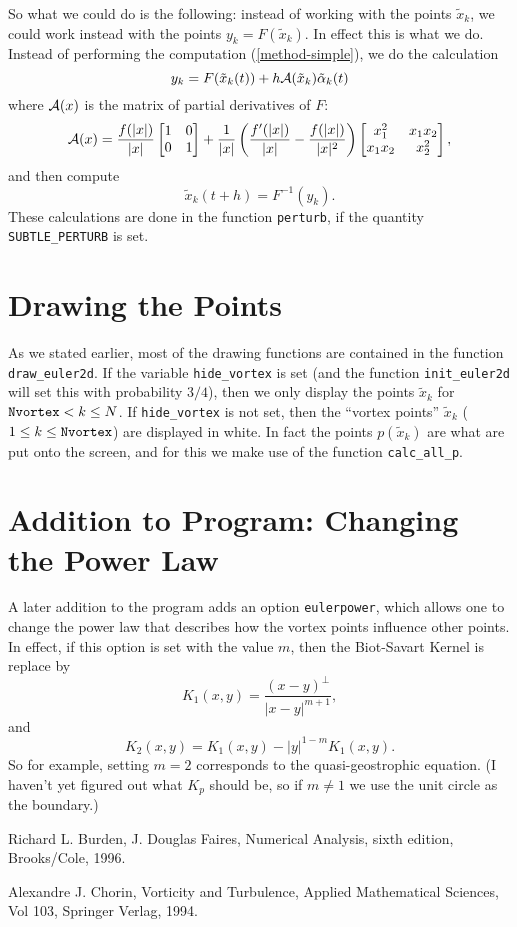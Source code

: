 \documentclass[12pt]{article}
\begin{document}
So what we could do is the following: instead of working with
the points $\tilde x_k$, we could work instead with the points
$y_k = F(\tilde x_k)$.  In effect this is what we do.
Instead of performing the computation (\ref{method-simple}),
we do the calculation
\begin{equation*}
y_k = F(\tilde x_k(t)) + h {\cal A}(\tilde x_k) \tilde\alpha_k(t)
\end{equation*}
where
${\cal A}(x)$ is the matrix of partial derivatives of $F$:
\begin{equation*}
{\cal A}(x) =
\frac{f(|x|)}{|x|}
\left[
\begin{matrix}
1 & 0\\
0 & 1
\end{matrix}
\right]
+ \frac1{|x|}
  \left(\frac{f'(|x|)}{|x|} - \frac{f(|x|)}{|x|^2}\right)
\left[
\begin{matrix}
x_{1}^2   & x_{1} x_{2}\\
x_{1} x_{2} & x_{2}^2
\end{matrix}
\right],
\end{equation*}
and then compute
\begin{equation*}
\tilde x_k(t+h) = F^{-1}(y_k).
\end{equation*}
These calculations are done in the function {\tt perturb}, if
the quantity {\tt SUBTLE\_PERTURB} is set.

\section{Drawing the Points}

As we stated earlier, most of the drawing functions are contained
in the function {\tt draw\_euler2d}.  If the variable
{\tt hide\_vortex} is set (and the function {\tt init\_euler2d}
will set this with probability $3/4$), then we only display
the points $\tilde x_k$ for ${\tt Nvortex} < k \le N$.  If
{\tt hide\_vortex} is not set, then the ``vortex points''
$\tilde x_k$ ($1 \le k \le {\tt Nvortex}$) are displayed in white.
In fact the points $p(\tilde x_k)$ are what are put onto the screen,
and for this we make use of the function {\tt calc\_all\_p}.

\section{Addition to Program: Changing the Power Law}

A later addition to the program adds an option {\tt eulerpower},
which allows one to change the power law that describes how
the vortex points influence other points.  In effect, if this
option is set with the value $m$, then the Biot-Savart Kernel
is replace by
$$ K_1(x,y) = \frac{(x-y)^\perp}{|x-y|^{m+1}}, $$
and
$$ K_2(x,y) = K_1(x,y) - |y|^{1-m} K_1(x,y) .$$
So for example, setting $m=2$ corresponds to the
quasi-geostrophic equation.  (I haven't yet figured out
what $K_p$ should be, so if $m \ne 1$ we use the unit circle
as the boundary.)

\begin{thebibliography}{9}

 Richard L. Burden, J. Douglas Faires, Numerical Analysis,
sixth edition, Brooks/Cole, 1996.

 Alexandre J. Chorin, Vorticity and Turbulence,
Applied Mathematical Sciences, Vol 103, Springer Verlag, 1994.

\end{thebibliography}
\end{document}
